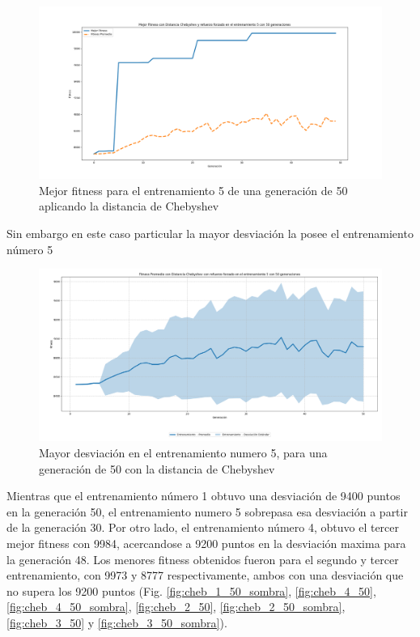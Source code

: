 \documentclass[conference]{IEEEtran}
\begin{document}
\begin{figure}[H]
    \centering
    \includegraphics[width=0.9\linewidth]{Chebyshev/Fitness_Individual_50Gen/Fitness_5_Cheby_50Gen.png}
    \caption{Mejor fitness para el entrenamiento 5 de una generación de 50 aplicando la distancia de Chebyshev}
    \label{fig:chy_5_best}
\end{figure}
Sin embargo en este caso particular la mayor desviación la posee el entrenamiento número 5
\begin{figure}[H]
    \centering
    \includegraphics[width=0.9\linewidth]{Chebyshev/Fitness_Individual_50Gen/Fitness_5_Cheby_50Gen_Sombra.png}
    \caption{Mayor desviación en el entrenamiento numero 5, para una generación de 50 con la distancia de Chebyshev}
    \label{fig:che_5_desv}
\end{figure}
Mientras que el entrenamiento número 1 obtuvo una desviación de 9400 puntos en la generación 50, el entrenamiento numero 5 sobrepasa esa desviación a partir de la generación 30. Por otro lado, el entrenamiento número 4, obtuvo el tercer mejor fitness con 9984, acercandose a 9200 puntos en la desviación maxima para la generación 48. Los menores fitness obtenidos fueron para el segundo y tercer entrenamiento, con 9973 y 8777 respectivamente, ambos con una desviación que no supera los 9200 puntos (Fig. \ref{fig:cheb_1_50_sombra}, \ref{fig:cheb_4_50}, \ref{fig:cheb_4_50_sombra}, \ref{fig:cheb_2_50}, \ref{fig:cheb_2_50_sombra}, \ref{fig:cheb_3_50} y \ref{fig:cheb_3_50_sombra}).
\end{document}
